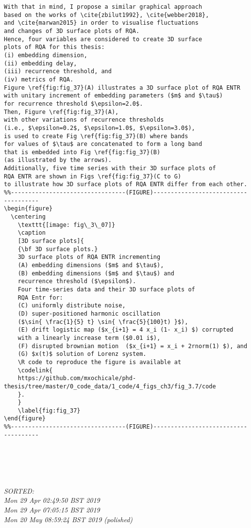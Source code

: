 \documentclass[12pt]{article}
\begin{document}
\begin{enumerate}
\begin{verbatim}
With that in mind, I propose a similar graphical approach 
based on the works of \cite{zbilut1992}, \cite{webber2018}, 
and \cite{marwan2015} in order to visualise fluctuations 
and changes of 3D surface plots of RQA.
Hence, four variables are considered to create 3D surface 
plots of RQA for this thesis: 
(i) embedding dimension,
(ii) embedding delay,
(iii) recurrence threshold, and 
(iv) metrics of RQA. 
Figure \ref{fig:fig_37}(A) illustrates a 3D surface plot of RQA ENTR  
with unitary increment of embedding parameters ($m$ and $\tau$)
for recurrence threshold $\epsilon=2.0$.
Then, Figure \ref{fig:fig_37}(A), 
with other variations of recurrence thresholds 
(i.e., $\epsilon=0.2$, $\epsilon=1.0$, $\epsilon=3.0$), 
is used to create Fig \ref{fig:fig_37}(B) where bands 
for values of $\tau$ are concatenated to form a long band
that is embedded into Fig \ref{fig:fig_37}(B) 
(as illustrated by the arrows).
Additionally, five time series with their 3D surface plots of 
RQA ENTR are shown in Figs \ref{fig:fig_37}(C to G)
to illustrate how 3D surface plots of RQA ENTR differ from each other.
%%---------------------------------(FIGURE)-------------------------------------
\begin{figure}
  \centering
    \texttt{[image: fig\_3\_07]}
    \caption
	[3D surface plots]{
	{\bf 3D surface plots.} 
	3D surface plots of RQA ENTR incrementing 
	(A) embedding dimensions ($m$ and $\tau$),
	(B) embedding dimensions ($m$ and $\tau$) and
	recurrence threshold ($\epsilon$).
	Four time-series data and their 3D surface plots of 
	RQA Entr for:
	(C) uniformly distribute noise,
	(D) super-positioned harmonic oscillation 
	($\sin{ \frac{1}{5} t} \sin{ \frac{5}{100}t) }$),
	(E) drift logistic map ($x_{i+1} = 4 x_i (1- x_i) $) corrupted 
	with a linearly increase term ($0.01 i$),
	(F) disrupted brownian motion  ($x_{i+1} = x_i + 2rnorm(1) $), and
	(G) $x(t)$ solution of Lorenz system.
	\R code to reproduce the figure is available at 
	\codelink{
	https://github.com/mxochicale/phd-thesis/tree/master/0_code_data/1_code/4_figs_ch3/fig_3.7/code
	}.
	}
    \label{fig:fig_37}
\end{figure}
%%---------------------------------(FIGURE)-------------------------------------






	\end{verbatim}
	\textit{
	SORTED:  \\
	Mon 29 Apr 02:49:50 BST 2019\\
	Mon 29 Apr 07:05:15 BST 2019 \\
	Mon 20 May 08:59:24 BST 2019 (polished)
	}
	\\



\end{enumerate}
\end{document}
